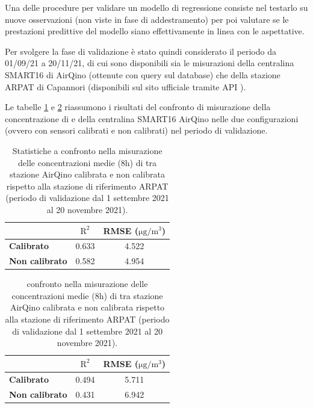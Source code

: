 Una delle procedure per validare un modello di regressione consiste nel testarlo su nuove osservazioni (non viste in fase di addestramento) per poi valutare se le prestazioni predittive del modello siano effettivamente in linea con le aspettative.

Per svolgere la fase di validazione è stato quindi considerato il periodo da 01/09/21 a 20/11/21, di cui sono disponibili sia le misurazioni della centralina SMART16 di AirQino (ottenute con query sul database) che della stazione ARPAT di Capannori (disponibili sul sito ufficiale tramite API \cite{arpat}).

Le tabelle \ref{tab:val-pm25} e \ref{tab:val-pm10} riassumono i risultati del confronto di misurazione della concentrazione di  e  della centralina SMART16 AirQino nelle due configurazioni (ovvero con sensori calibrati e non calibrati) nel periodo di validazione.

\begin{table}[H]
\footnotesize
\centering
\begin{tabular}{|l|c|c|}
\cline{2-3}
\multicolumn{1}{c|}{} & $\bm{\mathrm{R^2}}$ & \textbf{RMSE (}$\mathrm{\si{\micro}g/m^3}$) \\ \hline
\textbf{Calibrato} & 0.633 & 4.522 \\ \hline
\textbf{Non calibrato} & 0.582 & 4.954 \\ \hline
\end{tabular}
\caption{Statistiche a confronto nella misurazione delle concentrazioni medie (8h) di  tra stazione AirQino calibrata e non calibrata rispetto alla stazione di riferimento ARPAT (periodo di validazione dal 1 settembre 2021 al 20 novembre 2021).}
\label{tab:val-pm25}
\end{table}

\begin{table}[H]
\footnotesize
\centering
\begin{tabular}{|l|c|c|}
\cline{2-3}
\multicolumn{1}{c|}{} & $\bm{\mathrm{R^2}}$ & \textbf{RMSE (}$\mathrm{\si{\micro}g/m^3}$) \\ \hline
\textbf{Calibrato} & 0.494 & 5.711 \\ \hline
\textbf{Non calibrato} & 0.431 & 6.942 \\ \hline
\end{tabular}
\caption{confronto nella misurazione delle concentrazioni medie (8h) di  tra stazione AirQino calibrata e non calibrata rispetto alla stazione di riferimento ARPAT (periodo di validazione dal 1 settembre 2021 al 20 novembre 2021).}
\label{tab:val-pm10}
\end{table}

